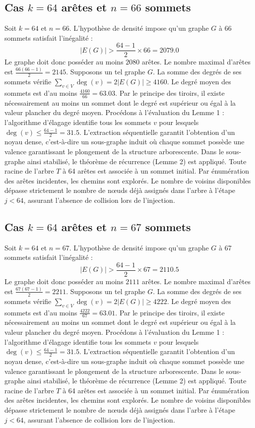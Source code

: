 \documentclass[12pt,a4paper]{article}
\begin{document}
\subsection{Cas $k = 64$ arêtes et $n = 66$ sommets}
Soit $k = 64$ et $n = 66$. L'hypothèse de densité impose qu'un graphe $G$ à 66 sommets satisfait l'inégalité :
$$ |E(G)| > \frac{64-1}{2} \times 66 = 2079.0 $$
Le graphe doit donc posséder au moins $2080$ arêtes. Le nombre maximal d'arêtes est $\frac{66(66-1)}{2} = 2145$.
Supposons un tel graphe $G$. La somme des degrés de ses sommets vérifie $\sum_{v \in V} \deg(v) = 2|E(G)| \geq 4160$.
Le degré moyen des sommets est d'au moins $\frac{4160}{66} = 63.03$.
Par le principe des tiroirs, il existe nécessairement au moins un sommet dont le degré est supérieur ou égal à la valeur plancher du degré moyen.
Procédons à l'évaluation du Lemme 1 : l'algorithme d'élagage identifie tous les sommets $v$ pour lesquels $\deg(v) \leq \frac{64-1}{2} = 31.5$.
L'extraction séquentielle garantit l'obtention d'un noyau dense, c'est-à-dire un sous-graphe induit où chaque sommet possède une valence garantissant le plongement de la structure arborescente.
Dans le sous-graphe ainsi stabilisé, le théorème de récurrence (Lemme 2) est appliqué. Toute racine de l'arbre $T$ à 64 arêtes est associée à un sommet initial. Par énumération des arêtes incidentes, les chemins sont explorés. Le nombre de voisins disponibles dépasse strictement le nombre de nœuds déjà assignés dans l'arbre à l'étape $j < 64$, assurant l'absence de collision lors de l'injection.

\subsection{Cas $k = 64$ arêtes et $n = 67$ sommets}
Soit $k = 64$ et $n = 67$. L'hypothèse de densité impose qu'un graphe $G$ à 67 sommets satisfait l'inégalité :
$$ |E(G)| > \frac{64-1}{2} \times 67 = 2110.5 $$
Le graphe doit donc posséder au moins $2111$ arêtes. Le nombre maximal d'arêtes est $\frac{67(67-1)}{2} = 2211$.
Supposons un tel graphe $G$. La somme des degrés de ses sommets vérifie $\sum_{v \in V} \deg(v) = 2|E(G)| \geq 4222$.
Le degré moyen des sommets est d'au moins $\frac{4222}{67} = 63.01$.
Par le principe des tiroirs, il existe nécessairement au moins un sommet dont le degré est supérieur ou égal à la valeur plancher du degré moyen.
Procédons à l'évaluation du Lemme 1 : l'algorithme d'élagage identifie tous les sommets $v$ pour lesquels $\deg(v) \leq \frac{64-1}{2} = 31.5$.
L'extraction séquentielle garantit l'obtention d'un noyau dense, c'est-à-dire un sous-graphe induit où chaque sommet possède une valence garantissant le plongement de la structure arborescente.
Dans le sous-graphe ainsi stabilisé, le théorème de récurrence (Lemme 2) est appliqué. Toute racine de l'arbre $T$ à 64 arêtes est associée à un sommet initial. Par énumération des arêtes incidentes, les chemins sont explorés. Le nombre de voisins disponibles dépasse strictement le nombre de nœuds déjà assignés dans l'arbre à l'étape $j < 64$, assurant l'absence de collision lors de l'injection.
\end{document}
